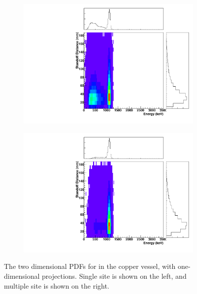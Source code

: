\documentclass[herrin-thesis.tex]{subfiles}
\begin{document}
\begin{figure}[hp]
\centering
	\begin{subfigure}[b]{0.35\textwidth}
	\centering
	\includegraphics[width=\textwidth]{./plots/PDFs/analysis_pdf_AllVessel_Zn65_ss.pdf}
\end{subfigure}\hspace{0.1\textwidth}%
\begin{subfigure}[b]{0.35\textwidth}
	\centering
	\includegraphics[width=1\textwidth]{./plots/PDFs/analysis_pdf_AllVessel_Zn65_ms.pdf}
	\end{subfigure}
\caption[PDF for  in the TPC vessel]{The two dimensional PDFs for  in the copper vessel, with one-dimensional projections. Single site is shown on the left, and multiple site is shown on the right.}
\label{fig:analysis_pdf_AllVessel_Zn65}
\end{figure}
\end{document}
